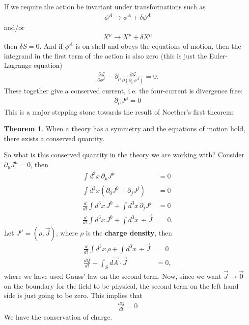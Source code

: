 \documentclass{book}
\numberwithin{equation}{section}
\theoremstyle{definition}
\newtheorem{thm}{Theorem}[section]
\newcommand{\p}{\partial}
\newcommand{\lag}{\mathcal{L}}
\newcommand{\nn}{\nonumber}
\begin{document}
If we require the action be invariant under transformations such as
\begin{align}
\phi^A \to \phi^A + \delta \phi^A
\end{align}
and/or 
\begin{align}
X^\mu \to X^\mu + \delta X^\mu
\end{align}
then $\delta S = 0$. And if $\phi^A$ is on shell and obeys the equations of motion, then the integrand in the first term of the action is also zero (this is just the Euler-Lagrange equation)
\begin{align}
\frac{\p \lag}{\p \phi^A} - \p_\mu\frac{\p \lag}{\p( \p_\mu\phi^A)} = 0.
\end{align}
These together give a conserved current, i.e. the four-current is divergence free:
\begin{align}
\boxed{\p_\mu J^\mu = 0}
\end{align}
This is a major stepping stone towards the result of Noether's first theorem:

\begin{thm}
	When a theory has a symmetry and the equations of motion hold, there exists a conserved quantity. 
\end{thm}

So what is this conserved quantity in the theory we are working with? Consider $\p_\mu J^\mu = 0$, then
\begin{align}
\int d^3x \, \p_\mu J^\mu &= 0\nn\\
\int d^3x \left(\p_0 J^0 + \p_j J^j\right) &= 0\nn\\
\frac{d}{dt}\int d^3x\, J^0 + \int d^3x\, \p_j J^j &= 0\nn\\
\frac{d}{dt}\int d^3x\, J^0 + \int d^3x\, \div{\vec{J}} &= 0.
\end{align}
Let $J^\mu = (\rho,\vec{J})$, where $\rho$ is the \textbf{charge density}, then
\begin{align}
\frac{d}{dt}\int d^3x\, \rho + \int d^3x\, \div{\vec{J}} &= 0\nn\\
\frac{dQ}{dt} + \int_S d\vec{A}\cdot \vec{J} &= 0,
\end{align}
where we have used Gauss' law on the second term. Now, since we want $\vec{J} \to \vec{0}$ on the boundary for the field to be physical, the second term on the left hand side is just going to be zero. This implies that
\begin{align}
\boxed{\frac{dQ}{dt} = 0}
\end{align}
We have the conservation of charge. \\
\end{document}
